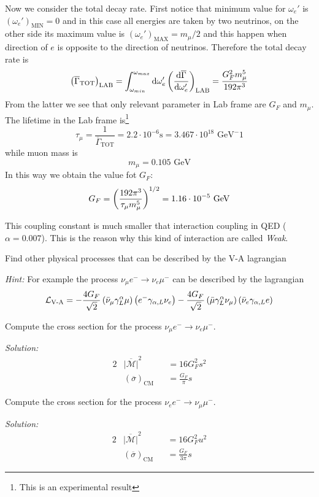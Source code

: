 \documentclass[TheoreticalPhy_ModB.tex]{subfiles}
\begin{document}
Now we consider the total decay rate. First notice that minimum value for $\omega_e'$ is $(\omega_e')_{\text{MIN}}=0$ and in this case all energies are taken by two neutrinos, on the other side its maximum value is $(\omega_e')_{\text{MAX}}=m_\mu/2$ and this happen when direction of $e$ is opposite to the direction of neutrinos. Therefore the total decay rate is
\[\left(\overline{\Gamma}_{\text{TOT}}\right)_{\text{LAB}}=\int_{\omega_{min}}^{\omega_{max}}\textup{d}\omega_e'\left(\frac{\textup{d}\overline\Gamma}{\textup{d}\omega_e'}\right)_{\text{LAB}}
=\frac{G_F^2m_\mu^5}{192\pi^3}\]
From the latter we see that only relevant parameter in Lab frame are $G_F$ and $m_\mu$. The lifetime in the Lab frame is\footnote{This is an experimental result}
\[\tau_\mu=\frac1{\overline\Gamma_{\text{TOT}}}=2.2\cdot 10^{-6}\text{s}
=3.467\cdot 10^{18}\text{ GeV}^-1\]
while muon mass is 
\[m_\mu=0.105\text{ GeV}\]
In this way we obtain the value fot $G_F$:
\[G_F=\left(\frac{192\pi^3}{\tau_\mu m_\mu^5}\right)^{1/2}=1.16\cdot 10^{-5}\text{ GeV}\]

This coupling constant is much smaller that interaction coupling in QED ($\alpha=0.007$). This is the reason why this kind of interaction are called \emph{Weak}.

\begin{exercise}
Find other physical processes that can be described by the V-A lagrangian

\skipline
\textit{Hint:}
For example the process $\nu_\mu e^-\to\nu_e\mu^-$ can be described by the lagrangian
\[\mathcal L_{\text{V-A}}=-\frac{4G_F}{\sqrt2}\left(\bar\nu_\mu\gamma^\alpha_L\mu\right)\left(e^-\gamma_{\alpha,L}\nu_e\right)-\frac{4G_F}{\sqrt2}\left(\bar\mu\gamma^\alpha_L\nu_\mu\right)\left(\bar\nu_e\gamma_{\alpha,L}e\right)\]
\end{exercise}


\begin{exercise}
Compute the cross section for the process $\nu_\mu e^-\to\nu_e\mu^-$.

\skipline
\textit{Solution:}
\begin{alignat*}{2}
&\overline{|\mathcal M|}^2&&=16G_F^2s^2\\
&(\overline\sigma)_{\text{CM}}&&=\frac{G_F}{\pi}s
\end{alignat*}
\end{exercise}

\begin{exercise}
Compute the cross section for the process $\nu_e e^-\to\nu_\mu\mu^-$.

\skipline
\textit{Solution:}
\begin{alignat*}{2}
&\overline{|\mathcal M|}^2&&=16G_F^2u^2\\
&(\overline\sigma)_{\text{CM}}&&=\frac{G_F}{3\pi}s
\end{alignat*}
\end{exercise}
\end{document}
